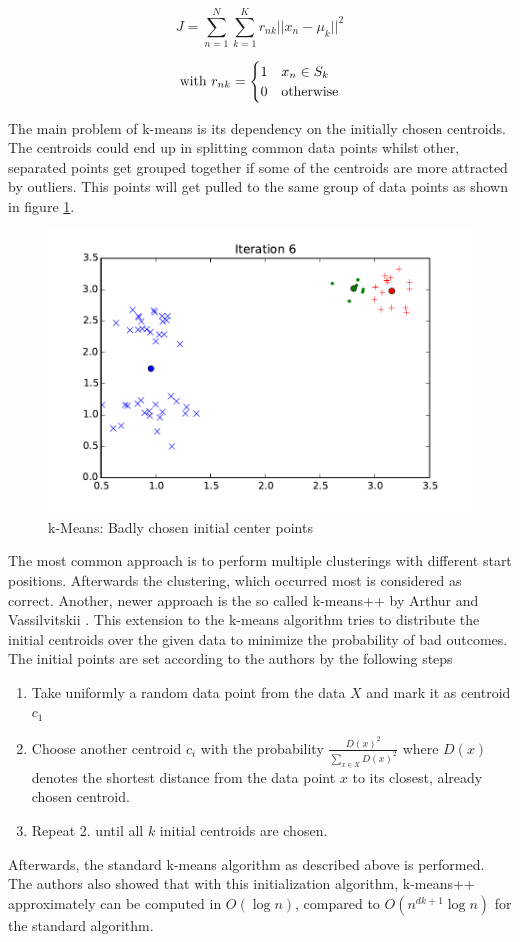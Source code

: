 \begin{equation}
J = \sum_{n=1}^{N} \sum_{k=1}^{K} r_{nk} ||x_n - \mu_k||^2
\label{eqn:kmeans_objective_function}
\end{equation}

\[
\text{with } \\
r_{nk} = \begin{cases}
1 & x_n \in S_k \\
0 & \text{otherwise}
\end{cases}
\]


The main problem of k-means is its dependency on the initially chosen centroids. The centroids could end up in splitting common data points whilst other, separated points get grouped together if some of the centroids are more attracted by outliers. This points will get pulled to the same group of data points as shown in figure \ref{fig:kmeans_bad}.


\begin{figure}[h]
\centering
\includegraphics[width=0.6\linewidth]{img/kmeans_bad}
\caption{k-Means: Badly chosen initial center points}
\label{fig:kmeans_bad}
\end{figure}

The most common approach is to perform multiple clusterings with different start positions. Afterwards the clustering, which occurred most is considered as correct. Another, newer approach is the so called k-means++ by Arthur and Vassilvitskii \cite{Arthur}. This extension to the k-means algorithm tries to distribute the initial centroids over the given data to minimize the probability of bad outcomes. The initial points are set according to the authors by the following steps

\begin{enumerate}
    \item Take uniformly a random data point from the data $X$ and mark it as centroid $c_1$
    \item Choose another centroid $c_i$ with the probability $\frac{D(x)^2}{\sum_{x \in X} D(x)^2}$ where $D(x)$ denotes the shortest distance from the data point $x$ to its closest, already chosen centroid.
    \item Repeat 2. until all $k$ initial centroids are chosen.
\end{enumerate}
Afterwards, the standard k-means algorithm as described above is performed. The authors also showed that with this initialization algorithm, k-means++ approximately can be computed in $O(\log n)$, compared to $O(n^{dk+1} \log n)$ for the standard algorithm.



